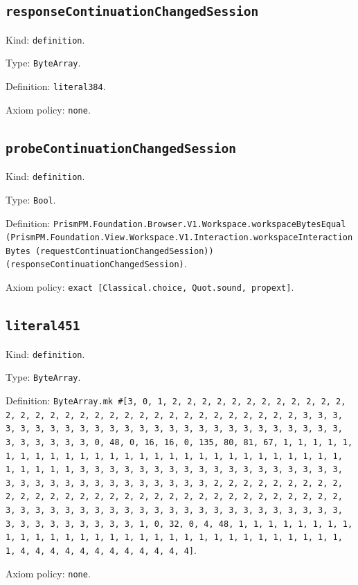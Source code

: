 \documentclass[11pt]{article}
\begin{document}
\subsection*{\texttt{responseContinuationChangedSession}}
\noindent Kind: \texttt{definition}.\par
\noindent Type: \texttt{ByteArray}.\par
\noindent Definition: \texttt{literal384}.\par
\noindent Axiom policy: \texttt{none}.\par
\subsection*{\texttt{probeContinuationChangedSession}}
\noindent Kind: \texttt{definition}.\par
\noindent Type: \texttt{Bool}.\par
\noindent Definition: \texttt{PrismPM.Foundation.Browser.V1.Workspace.workspaceBytesEqual (PrismPM.Foundation.View.Workspace.V1.Interaction.workspaceInteractionBytes (requestContinuationChangedSession)) (responseContinuationChangedSession)}.\par
\noindent Axiom policy: \texttt{exact [Classical.choice, Quot.sound, propext]}.\par
\subsection*{\texttt{literal451}}
\noindent Kind: \texttt{definition}.\par
\noindent Type: \texttt{ByteArray}.\par
\noindent Definition: \texttt{ByteArray.mk \#[3, 0, 1, 2, 2, 2, 2, 2, 2, 2, 2, 2, 2, 2, 2, 2, 2, 2, 2, 2, 2, 2, 2, 2, 2, 2, 2, 2, 2, 2, 2, 2, 2, 2, 2, 3, 3, 3, 3, 3, 3, 3, 3, 3, 3, 3, 3, 3, 3, 3, 3, 3, 3, 3, 3, 3, 3, 3, 3, 3, 3, 3, 3, 3, 3, 3, 3, 0, 48, 0, 16, 16, 0, 135, 80, 81, 67, 1, 1, 1, 1, 1, 1, 1, 1, 1, 1, 1, 1, 1, 1, 1, 1, 1, 1, 1, 1, 1, 1, 1, 1, 1, 1, 1, 1, 1, 1, 1, 1, 1, 3, 3, 3, 3, 3, 3, 3, 3, 3, 3, 3, 3, 3, 3, 3, 3, 3, 3, 3, 3, 3, 3, 3, 3, 3, 3, 3, 3, 3, 3, 3, 3, 2, 2, 2, 2, 2, 2, 2, 2, 2, 2, 2, 2, 2, 2, 2, 2, 2, 2, 2, 2, 2, 2, 2, 2, 2, 2, 2, 2, 2, 2, 2, 2, 3, 3, 3, 3, 3, 3, 3, 3, 3, 3, 3, 3, 3, 3, 3, 3, 3, 3, 3, 3, 3, 3, 3, 3, 3, 3, 3, 3, 3, 3, 3, 3, 1, 0, 32, 0, 4, 48, 1, 1, 1, 1, 1, 1, 1, 1, 1, 1, 1, 1, 1, 1, 1, 1, 1, 1, 1, 1, 1, 1, 1, 1, 1, 1, 1, 1, 1, 1, 1, 1, 4, 4, 4, 4, 4, 4, 4, 4, 4, 4, 4, 4]}.\par
\noindent Axiom policy: \texttt{none}.\par
\end{document}
